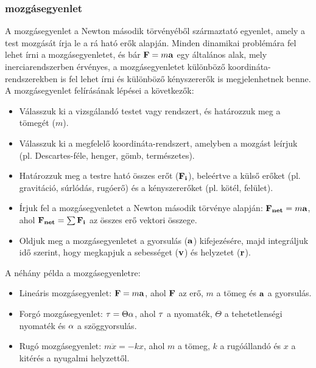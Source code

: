\documentclass[../main.tex]{subfiles}
\begin{document}
\subsubsection{mozgásegyenlet}
A mozgásegyenlet a Newton második törvényéből származtató egyenlet, amely a test mozgását írja le a rá ható erők alapján. Minden dinamikai problémára fel lehet írni a mozgásegyenletet, és bár $\bold{F} = m\bold{a}$ egy általános alak, mely inerciarendszerben érvényes,
a mozgásegyenletet különböző koordináta-rendszerekben is fel lehet írni és különböző kényszererők is megjelenhetnek benne. A mozgásegyenlet felírásának lépései a következők:
\begin{itemize}
    \item Válasszuk ki a vizsgálandó testet vagy rendszert, és határozzuk meg a tömegét ($m$).
    \item Válasszuk ki a megfelelő koordináta-rendszert, amelyben a mozgást leírjuk (pl. Descartes-féle, henger, gömb, természetes).
    \item Határozzuk meg a testre ható összes erőt ($\bold{F_i}$), beleértve a külső erőket (pl. gravitáció, súrlódás, rugóerő) és a kényszererőket (pl. kötél, felület).
    \item Írjuk fel a mozgásegyenletet a Newton második törvénye alapján: $\bold{F_{net}} = m\bold{a}$, ahol $\bold{F_{net}} = \sum \bold{F_i}$ az összes erő vektori összege.
    \item Oldjuk meg a mozgásegyenletet a gyorsulás ($\bold{a}$) kifejezésére, majd integráljuk idő szerint, hogy megkapjuk a sebességet ($\bold{v}$) és helyzetet ($\bold{r}$).
\end{itemize}
A néhány példa a mozgásegyenletre:
\begin{itemize}
    \item Lineáris mozgásegyenlet: $\bold{F} = m\bold{a}$, ahol $\bold{F}$ az erő, $m$ a tömeg és $\bold{a}$ a gyorsulás.
    \item Forgó mozgásegyenlet: $\bold{\tau} = \Theta\bold{\alpha}$, ahol $\bold{\tau}$ a nyomaték, $\Theta$ a tehetetlenségi nyomaték és $\bold{\alpha}$ a szöggyorsulás.
    \item Rugó mozgásegyenlet: $m\ddot{x} = -kx$, ahol $m$ a tömeg, $k$ a rugóállandó és $x$ a kitérés a nyugalmi helyzettől.
\end{itemize}
\end{document}
